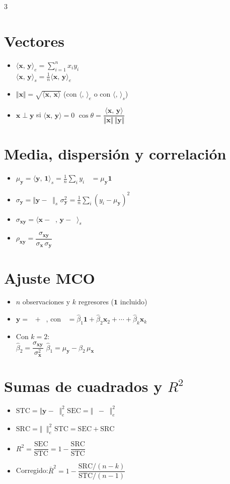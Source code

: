 \documentclass[10pt]{article}
\newcommand{\vv}[1]{\boldsymbol{#1}}
\newcommand{\uno}{\boldsymbol{1}}
\newcommand{\media}[1]{\boldsymbol{\mathop{\overline{#1}}}}
\newcommand{\gorro}[1]{\boldsymbol{\mathop{\widehat{#1}}}}
\newcommand{\pe}[2]{\langle #1,\,#2\rangle}
\newcommand{\norma}[1]{\Vert #1\Vert}
\newcommand{\SRC}{\mathrm{SRC}}\newcommand{\SEC}{\mathrm{SEC}}\newcommand{\STC}{\mathrm{STC}}
\begin{document}
\raggedcolumns
\begin{multicols}{3}
\section{Vectores}
\begin{itemize}
\item $\pe{\vv x}{\vv y}_e=\sum_{i=1}^n x_iy_i$\\ $\pe{\vv x}{\vv y}_s=\frac1n\pe{\vv x}{\vv y}_e$
\item $\norma{\vv x}=\sqrt{\pe{\vv x}{\vv x}}$ \quad (con $\pe{}{}_e$ o con $\pe{}{}_s$)
\item $\vv x\perp\vv y$ si $\pe{\vv x}{\vv y}=0$ \qquad $\cos\theta=\dfrac{\pe{\vv x}{\vv y}}{\norma{\vv x}\,\norma{\vv y}}$
\end{itemize}

\section{Media, dispersión y correlación}
\begin{itemize}
\item $\mu_{\vv y}=\pe{\vv y}{\uno}_s=\frac1n\sum_i y_i$ \qquad $\media y=\mu_{\vv y}\uno$
\item $\sigma_{\vv y}=\norma{\vv y-\media y}_s$ \qquad $\sigma^2_{\vv y}=\frac1n\sum_i(y_i-\mu_{\vv y})^2$
\item $\sigma_{\vv x\vv y}=\pe{\vv x-\media x}{\vv y-\media y}_s$
\item $\rho_{\vv x\vv y}=\dfrac{\sigma_{\vv x\vv y}}{\sigma_{\vv x}\,\sigma_{\vv y}}$
\end{itemize}

\section{Ajuste MCO}
\begin{itemize}
\item $n$ observaciones y $k$ regresores ($\uno$ incluido)
\item $\vv y=\gorro y+\gorro e$, con $\gorro y=\hat\beta_1\uno+\hat\beta_2\vv x_2+\cdots+\hat\beta_k\vv x_k$
\item Con $k=2$:\\[2pt] $\hat\beta_2=\dfrac{\sigma_{\vv x\vv y}}{\sigma^2_{\vv x}}$ \qquad $\hat\beta_1=\mu_{\vv y}-\hat\beta_2\,\mu_{\vv x}$
\end{itemize}

\columnbreak
\section{Sumas de cuadrados y $R^2$}
\begin{itemize}
\item $\STC=\norma{\vv y-\media y}_e^2$ \qquad $\SEC=\norma{\gorro y-\media y}_e^2$
\item $\SRC=\norma{\gorro e}_e^2$ \qquad $\STC=\SEC+\SRC$
\item $R^2=\dfrac{\SEC}{\STC}=1-\dfrac{\SRC}{\STC}$
\item Corregido:\quad $\bar R^2=1-\dfrac{\SRC/(n-k)}{\STC/(n-1)}$
\end{itemize}


\end{multicols}
\end{document}
